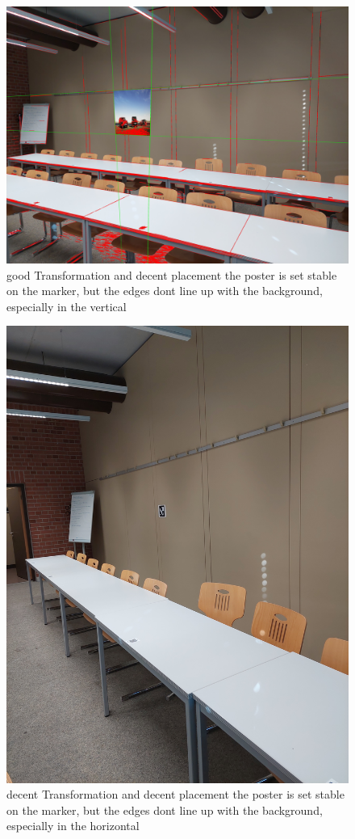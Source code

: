 \documentclass[a4paper,twocolumn]{article}
\begin{document}
    \begin{figure}[h!]
    \centering
    \includegraphics[width=0.9\columnwidth]{img/20221115_113401.jpg} %
    \caption{good Transformation and decent placement the poster is set stable on the marker, but the edges dont line up with the background, especially in the vertical}
    \label{fig:20221115_113401.jpg}
    \end{figure}
    \begin{figure}[h!]
    \centering
    \includegraphics[width=0.9\columnwidth]{img/20221115_113412.jpg} %
    \caption{decent Transformation and decent placement the poster is set stable on the marker, but the edges dont line up with the background, especially in the horizontal}
    \label{fig:20221115_113412.jpg}
    \end{figure}
    
\end{document}
